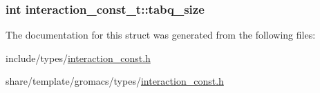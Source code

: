 \hypertarget{structinteraction__const__t_abff4ef1127eb2d16922285bd766dda74}{
\subsubsection[{tabq\-\_\-size}]{\setlength{\rightskip}{0pt plus 5cm}int {\bf interaction\-\_\-const\-\_\-t\-::tabq\-\_\-size}}}\label{structinteraction__const__t_abff4ef1127eb2d16922285bd766dda74}


\-The documentation for this struct was generated from the following files\-:\begin{DoxyCompactItemize}
\item 
include/types/\hyperlink{include_2types_2interaction__const_8h}{interaction\-\_\-const.\-h}\item 
share/template/gromacs/types/\hyperlink{share_2template_2gromacs_2types_2interaction__const_8h}{interaction\-\_\-const.\-h}\end{DoxyCompactItemize}
